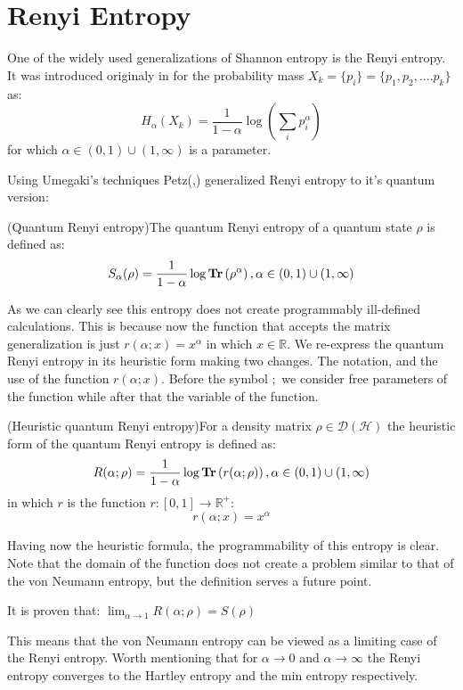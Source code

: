\section{Renyi Entropy}
One of the widely used generalizations of Shannon entropy is the Renyi entropy. It was introduced originaly in \cite{renyi1961measures} for the probability mass  $X_k=\{p_{i}\}=\{p_{1},p_{2},....p_{k}\}$ as:
\begin{equation}
H_{\alpha}\left(X_{k}\right)=\frac{1}{1-\alpha} \log \left(\sum_{i} p_{i}^{\alpha}\right)
\end{equation}
for which $\alpha \in (0,1) \cup (1,\infty)$ is a parameter.
\par 
Using Umegaki's techniques Petz(\cite{petz1986quasi},\cite{umegaki1962conditional}) generalized Renyi entropy to it's quantum version:
\begin{definition}
(Quantum Renyi entropy)The quantum Renyi entropy of a quantum state $\rho$ is defined as:
\begin{equation}
S_{\alpha}(\rho)=\frac{1}{1-\alpha} \log \operatorname{\textup{\textbf{Tr}}}\left(\rho^{\alpha}\right), \alpha \in(0,1) \cup(1, \infty)
\end{equation}
\end{definition}
As we can clearly see this entropy does not create programmably ill-defined calculations. This is because now the function that accepts the matrix generalization is just $r(\alpha;x)=x^{\alpha}$
in which $x \in \mathbb{R}$. We re-express the quantum Renyi entropy in its heuristic form making two changes. The notation, and the use of the function $r(\alpha;x)$. Before the symbol $;$ we consider free parameters of the function while after that the variable of the function.
\begin{definition}(Heuristic quantum Renyi entropy)For a density matrix $\rho \in \mathcal{D}(\mathcal{H})$ the heuristic form of the quantum Renyi entropy is defined as:
\begin{equation}
R(\alpha ; \rho)= \frac{1}{1-\alpha} \log \operatorname{\textup{\textbf{Tr}}} \left(r(\alpha;\rho)\right), \alpha \in(0,1) \cup(1, \infty)
\end{equation}
in which $r$ is the function $r:[0,1] \rightarrow \mathbb{R^{+}}$:
\begin{equation}
r(\alpha;x)=x^{\alpha}
\end{equation}
\label{renyi}
\end{definition}
Having now the heuristic formula, the programmability of this entropy is clear. Note that  the domain of the function does not create a problem similar to that of the von Neumann entropy, but the definition serves a future point. 
\begin{note}
It is proven that: $\lim _{\alpha \rightarrow 1} R(\alpha;\rho)=S(\rho)$
\end{note}
\noindent
This means that the von Neumann  entropy can be viewed as a limiting case of the Renyi entropy. Worth mentioning that for $\alpha \to 0$ and $\alpha \to \infty$ the Renyi entropy converges to the Hartley entropy and the min entropy respectively.
